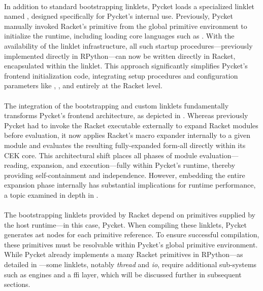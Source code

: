 
		\paragraph{}%
			In addition to standard bootstrapping linklets, Pycket loads a specialized linklet named , designed specifically for Pycket's internal use. Previously, Pycket manually invoked Racket’s  primitive from the global primitive environment to initialize the runtime, including loading core languages such as . With the availability of the linklet infrastructure, all such startup procedures—previously implemented directly in RPython—can now be written directly in Racket, encapsulated within the  linklet. This approach significantly simplifies Pycket’s frontend initialization code, integrating setup procedures and configuration parameters like , , and  entirely at the Racket level.


		\paragraph{}%
			The integration of the bootstrapping and custom linklets fundamentally transforms Pycket's frontend architecture, as depicted in . Whereas previously Pycket had to invoke the Racket executable externally to expand Racket modules before evaluation, it now applies Racket's macro expander internally to a given module and evaluates the resulting fully-expanded form-all directly within its CEK core. This architectural shift places all phases of module evaluation—reading, expansion, and execution—fully within Pycket’s runtime, thereby providing self-containment and independence. However, embedding the entire expansion phase internally has substantial implications for runtime performance, a topic examined in depth in .

		\paragraph{}%
			The bootstrapping linklets provided by Racket depend on primitives supplied by the host runtime—in this case, Pycket. When compiling these linklets, Pycket generates \gls{ast} nodes for each primitive reference. To ensure successful compilation, these primitives must be resolvable within Pycket's global primitive environment. While Pycket already implements a many Racket primitives in RPython—as detailed in —some linklets, notably \emph{thread} and \emph{io}, require additional sub-systems such as engines and a \gls{ffi} layer, which will be discussed further in subsequent sections.

